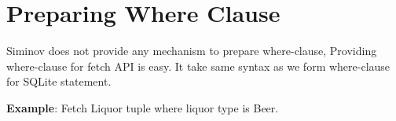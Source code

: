 \section{Preparing Where Clause}
Siminov does not provide any mechanism to prepare where-clause, Providing where-clause for fetch API is easy. It take same syntax as we form where-clause for SQLite statement.

\textbf{Example}: Fetch Liquor tuple where liquor type is Beer.
	
	


